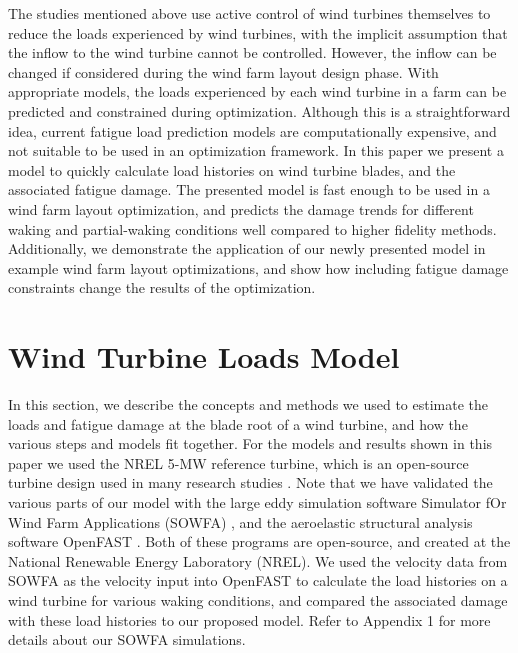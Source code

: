 \documentclass[11pt,letterpaper]{article}
\begin{document}
The studies mentioned above use active control of wind turbines themselves to reduce the loads experienced by wind turbines, with the implicit assumption that the inflow to the wind turbine cannot be controlled. 
However, the inflow can be changed if considered during the wind farm layout design phase.
With appropriate models, the loads experienced by each wind turbine in a farm can be predicted and constrained during optimization. 
Although this is a straightforward idea, current fatigue load prediction models are computationally expensive, and not suitable to be used in an optimization framework.
% 
In this paper we present a model to quickly calculate load histories on wind turbine blades, and the associated fatigue damage. The presented model is fast enough to be used in a wind farm layout optimization, and predicts the damage trends for different waking and partial-waking conditions well compared to higher fidelity methods. 
% 
Additionally, we demonstrate the application of our newly presented model in example wind farm layout optimizations, and show how including fatigue damage constraints change the results of the optimization.

% 
% 

\section{Wind Turbine Loads Model}
\label{sec1}
In this section, we describe the concepts and methods we used to estimate the loads and fatigue damage at the blade root of a wind turbine, and how the various steps and models fit together. For the models and results shown in this paper we used the NREL 5-MW reference turbine, which is an open-source turbine design used in many research studies \cite{jonkman2009definition}.
% 
Note that we have validated the various parts of our model with the large eddy simulation software Simulator fOr Wind Farm Applications (SOWFA) \cite{churchfield2012nwtc}, and the aeroelastic structural analysis software OpenFAST \cite{openfast_docs}. Both of these programs are open-source, and created at the National Renewable Energy Laboratory (NREL). We used the velocity data from SOWFA as the velocity input into OpenFAST to calculate the load histories on a wind turbine for various waking conditions, and compared the associated damage with these load histories to our proposed model. Refer to Appendix 1 for more details about our SOWFA simulations. 
\end{document}
